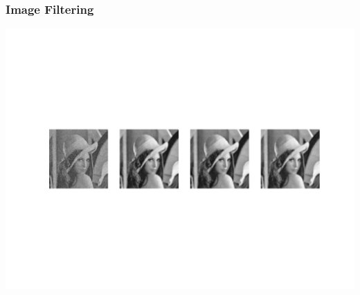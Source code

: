 \documentclass[10pt,colorlinks]{beamer}
\begin{document}
\begin{frame}[fragile]\frametitle{Image Filtering}
\includegraphics[width=\textwidth]{plwfigis/CursP_3_figure67}

\end{frame}
\end{document}
